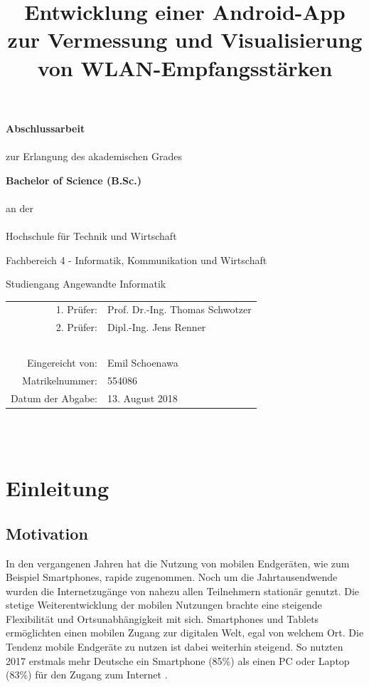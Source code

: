 \documentclass[10pt]{scrartcl}
\title{Entwicklung einer Android-App zur Vermessung und Visualisierung von WLAN-Empfangsstärken}
\date{\vspace{-5ex}}
\begin{document}
\begin{titlepage}
\maketitle
{
\thispagestyle{empty}
\centering
\Large{
\textbf{Abschlussarbeit}
\\~\\
zur Erlangung des akademischen Grades

\textbf{Bachelor of Science (B.Sc.)}
\\~\\
an der
\\~\\
Hochschule für Technik und Wirtschaft

Fachbereich 4 - Informatik, Kommunikation und Wirtschaft

Studiengang Angewandte Informatik
\vfill
}
}
\begin{tabular}{rl}
1. Prüfer: & Prof. Dr.-Ing. Thomas Schwotzer\\
2. Prüfer: & Dipl.-Ing. Jens Renner\\~\\
Eingereicht von: & Emil Schoenawa\\
Matrikelnummer: & 554086\\
Datum der Abgabe: & 13. August 2018
\end{tabular}
\\~\\
\end{titlepage}

\tableofcontents
\cleardoublepage
{}

\section{Einleitung}
\subsection{Motivation}
In den vergangenen Jahren hat die Nutzung von mobilen Endgeräten, wie zum Beispiel Smartphones, rapide zugenommen. Noch um die Jahrtausendwende wurden die Internetzugänge von nahezu allen Teilnehmern stationär genutzt. Die stetige Weiterentwicklung der mobilen Nutzungen brachte eine steigende Flexibilität und Ortsunabhängigkeit mit sich. Smartphones und Tablets ermöglichten einen mobilen Zugang zur digitalen Welt, egal von welchem Ort. Die Tendenz mobile Endgeräte zu nutzen ist dabei weiterhin steigend. So nutzten 2017 erstmals mehr Deutsche ein Smartphone (85\%) als einen PC oder Laptop (83\%) für den Zugang zum Internet \cite{tns2017}.
\end{document}
